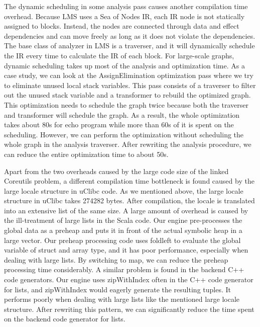\documentclass[sigplan, nonacm]{acmart}\settopmatter{printfolios=true,printccs=false,printacmref=false}
\begin{document}
The dynamic scheduling in some analysis pass causes another compilation time overhead. Because LMS uses a Sea of Nodes IR, each IR node is not statically assigned to blocks. Instead, the nodes are connected through data and effect dependencies and can move freely as long as it does not violate the dependencies. The base class of analyzer in LMS is a traverser, and it will dynamically schedule the IR every time to calculate the IR of each block. For large-scale graphs, dynamic scheduling takes up most of the analysis and optimization time. As a case study, we can look at the AssignElimination optimization pass where we try to eliminate unused local stack variables. This pass consists of a traverser to filter out the unused stack variable and a transformer to rebuild the optimized graph. This optimization needs to schedule the graph twice because both the traverser and transformer will schedule the graph. As a result, the whole optimization takes about 80s for echo program while more than 60s of it is spent on the scheduling. However, we can perform the optimization without scheduling the whole graph in the analysis traverser. After rewriting the analysis procedure, we can reduce the entire optimization time to about 50s. \par
Apart from the two overheads caused by the large code size of the linked Coreutils problem, a different compilation time bottleneck is found caused by the large locale structure in uClibc code. As we mentioned above, the large locale structure in uClibc takes 274282 bytes. After compilation, the locale is translated into an extensive list of the same size. A large amount of overhead is caused by the ill-treatment of large lists in the Scala code. Our engine pre-processes the global data as a preheap and puts it in front of the actual symbolic heap in a large vector. Our preheap processing code uses foldleft to evaluate the global variable of struct and array type, and it has poor performance, especially when dealing with large lists. By switching to map, we can reduce the preheap processing time considerably. A similar problem is found in the backend C++ code generators. Our engine uses zipWithIndex often in the C++ code generator for lists, and zipWithIndex would eagerly generate the resulting tuples. It performs poorly when dealing with large lists like the mentioned large locale structure. After rewriting this pattern, we can significantly reduce the time spent on the backend code generator for lists.
\end{document}
